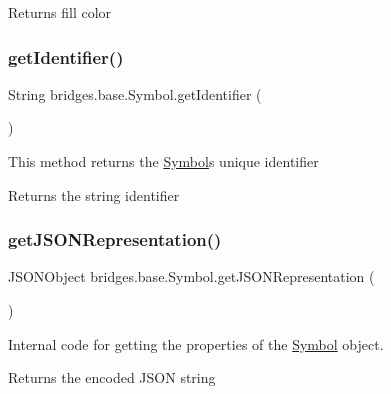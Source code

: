 \begin{DoxyReturn}{Returns}
fill color 
\end{DoxyReturn}
\mbox{\label{classbridges_1_1base_1_1_symbol_a53cea862b06ffc230ca68d4d34c8820d}} 
\subsubsection{\texorpdfstring{getIdentifier()}{getIdentifier()}}
{\footnotesize\ttfamily String bridges.\+base.\+Symbol.\+get\+Identifier (\begin{DoxyParamCaption}{ }\end{DoxyParamCaption})}

This method returns the \mbox{\hyperlink{classbridges_1_1base_1_1_symbol}{Symbol}}\textquotesingle{}s unique identifier \begin{DoxyReturn}{Returns}
the string identifier 
\end{DoxyReturn}
\mbox{\label{classbridges_1_1base_1_1_symbol_aeba4cfa5b39fe03e72a568a8b7452e60}} 
\subsubsection{\texorpdfstring{getJSONRepresentation()}{getJSONRepresentation()}}
{\footnotesize\ttfamily J\+S\+O\+N\+Object bridges.\+base.\+Symbol.\+get\+J\+S\+O\+N\+Representation (\begin{DoxyParamCaption}{ }\end{DoxyParamCaption})}

Internal code for getting the properties of the \mbox{\hyperlink{classbridges_1_1base_1_1_symbol}{Symbol}} object. \begin{DoxyReturn}{Returns}
the encoded J\+S\+ON string 
\end{DoxyReturn}
\mbox{\label{classbridges_1_1base_1_1_symbol_a7616c25b288a6e464f4f0b5fe4bd2826}} 
